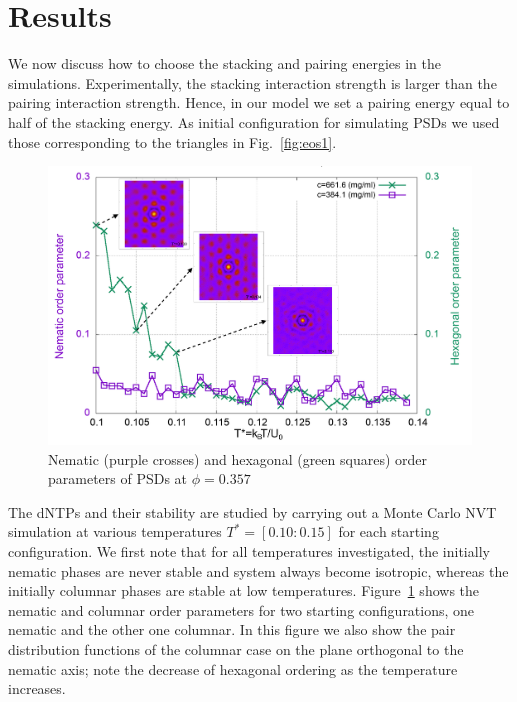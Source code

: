 \documentclass[aip,jcp, amsmath, amssymb, reprint]{revtex4-1}
\begin{document}
\section{\label{Results}Results}
We now discuss how to choose the stacking and pairing energies in the simulations. Experimentally, the stacking interaction
strength is larger than the pairing interaction strength. 
Hence, in our model we set a pairing energy equal to half of the stacking energy.
As initial configuration for simulating PSDs we used those corresponding to the triangles in Fig.~\ref{fig:eos1}.
\begin{figure}[h!]
\includegraphics[width=0.99\linewidth]{par.png}
\caption{\label{fig:par} Nematic (purple crosses) and hexagonal (green squares) order parameters
  of PSDs at $\phi=0.357$
}
\end{figure}


The dNTPs and their stability are studied by carrying out a Monte Carlo NVT simulation at various temperatures
$T^*=[0.10:0.15]$ for each starting configuration. We first note that for all temperatures investigated, the initially
nematic phases are never stable and system always become isotropic, whereas the initially columnar phases are stable at
low temperatures.  Figure~\ref{fig:par} shows the nematic and columnar order parameters for two starting
configurations, one nematic and the other one columnar. In this figure we also show the pair  distribution functions of
the columnar case on the plane orthogonal to the nematic axis; note the decrease of hexagonal ordering as the
temperature increases.
\end{document}
